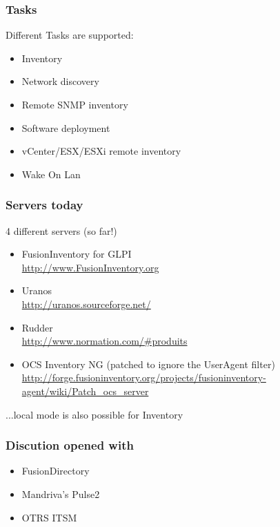 \documentclass{beamer}
\begin{document}
\begin{frame}
    \frametitle{Tasks}
    Different Tasks are supported:
    \begin{itemize}

        \item Inventory
        \item Network discovery
        \item Remote SNMP inventory
        \item Software deployment
        \item vCenter/ESX/ESXi remote inventory
        \item Wake On Lan
    \end{itemize}
\end{frame}

\begin{frame}
    \frametitle{Servers today}

    \begin{block}{4 different servers (so far!)}
        \begin{itemize}
            \item FusionInventory for GLPI \\
            \url{http://www.FusionInventory.org}
            \item Uranos \\
            \url{http://uranos.sourceforge.net/}
            \item Rudder \\
            \url{http://www.normation.com/\#produits}
            \item OCS Inventory NG (patched to ignore the UserAgent filter) \\
            \url{http://forge.fusioninventory.org/projects/fusioninventory-agent/wiki/Patch\_ocs\_server}
        \end{itemize}
        ...local mode is also possible for Inventory
    \end{block}

\end{frame}

\begin{frame}
    \frametitle{Discution opened with}

    \begin{itemize}
    \item FusionDirectory 
    \item Mandriva's Pulse2
    \item OTRS ITSM 
    \end{itemize}
\end{frame}
\end{document}
